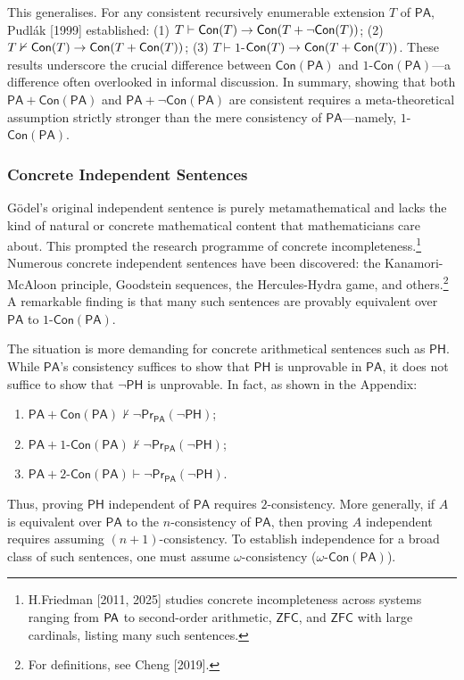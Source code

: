\documentclass[a4paper,12pt]{amsart}
\theoremstyle{definition}
\numberwithin{equation}{section}
\begin{document}
This generalises. For any consistent recursively enumerable extension 
$T$ of \(\mathsf{PA}\), Pudl\'ak [1999] established: (1) $T\vdash {\sf Con}(T)\rightarrow {\sf Con}(T+\neg {\sf Con}(T))$; (2) $T\nvdash {\sf Con}(T)\rightarrow {\sf Con}(T+{\sf Con}(T))$;  (3)   $T\vdash 1$-${\sf Con}(T)\rightarrow {\sf Con}(T+ {\sf Con}(T))$. These results underscore the crucial difference between 
\(\mathsf{Con(PA)}\) and \(1\)-\(\mathsf{Con(PA)}\)---a difference often 
overlooked in informal discussion. 
In summary, showing that both \(\mathsf{PA}+\mathsf{Con(PA)}\) and \(\mathsf{PA}+\neg\mathsf{Con(PA)}\) are consistent requires a meta-theoretical assumption strictly stronger than the mere consistency of \(\mathsf{PA}\)—namely, \(1\)-\(\mathsf{Con(PA)}\). 

\subsubsection{Concrete Independent Sentences}
G\"odel's original independent sentence is purely metamathematical and 
lacks the kind of natural or concrete mathematical content that 
mathematicians care about. This prompted the research programme of 
concrete incompleteness.\footnote{H.Friedman [2011, 2025] studies concrete incompleteness across systems ranging from ${\sf PA}$ to second-order arithmetic, $\mathsf{ZFC}$, and $\mathsf{ZFC}$ with large cardinals, listing many such sentences.} Numerous concrete independent sentences have 
been discovered: the Kanamori-McAloon principle, Goodstein sequences, 
the Hercules-Hydra game, and others.\footnote{For definitions, see Cheng [2019].}  A remarkable finding is that many 
such sentences are provably equivalent over \(\mathsf{PA}\) to \(1\)-\(\mathsf{Con(PA)}\). 

The situation is more demanding for concrete arithmetical sentences 
such as \(\mathsf{PH}\). While \(\mathsf{PA}\)'s consistency suffices to show that \(\mathsf{PH}\) is 
unprovable in \(\mathsf{PA}\), it does not suffice to show that \(\neg\mathsf{PH}\) is 
unprovable. In fact, as shown in the Appendix:
\begin{enumerate}[(1)]
\item \(\mathsf{PA}+\mathsf{Con(PA)}\nvdash \neg\mathsf{Pr}_{\mathsf{PA}}(\neg\mathsf{PH})\);
\item \(\mathsf{PA}+1\text{-}\mathsf{Con(PA)}\nvdash \neg\mathsf{Pr}_{\mathsf{PA}}(\neg\mathsf{PH})\);
\item \(\mathsf{PA}+2\text{-}\mathsf{Con(PA)}\vdash \neg\mathsf{Pr}_{\mathsf{PA}}(\neg\mathsf{PH})\).
\end{enumerate}
Thus, proving \(\mathsf{PH}\) independent of \(\mathsf{PA}\) requires \(2\)-consistency. More 
generally, if $A$ is equivalent over \(\mathsf{PA}\) to the $n$-consistency of \(\mathsf{PA}\), 
then proving $A$ independent requires assuming $(n+1)$-consistency. To 
establish independence for a broad class of such sentences, one must 
assume $\omega$-consistency (\(\omega\)-\(\mathsf{Con(PA)}\)).
  
\end{document}
